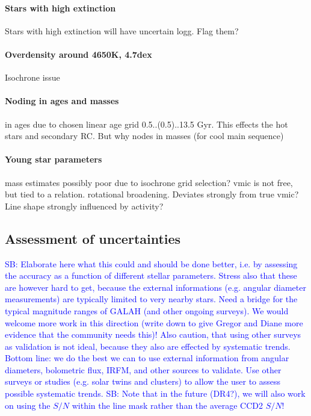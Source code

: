 \documentclass[fleqn,usenatbib,useAMS]{mnras}
\newcommand\SB[1]{\textcolor{blue}{SB: #1}}
\begin{document}
\paragraph*{Stars with high extinction} Stars with high extinction will have uncertain logg. Flag them?

\paragraph*{Overdensity around 4650K, 4.7dex} Isochrone issue

\paragraph*{Noding in ages and masses} in ages due to chosen linear age grid 0.5..(0.5)..13.5 Gyr. This effects the hot stars and secondary RC. But why nodes in masses (for cool main sequence)

\paragraph*{Young star parameters} mass estimates possibly poor due to isochrone grid selection? vmic is not free, but tied to a relation. rotational broadening. Deviates strongly from true vmic? Line shape strongly influenced by activity?

\subsection{Assessment of uncertainties}

\SB{Elaborate here what this could and should be done better, i.e. by assessing the accuracy as a function of different stellar parameters. Stress also that these are however hard to get, because the external informations (e.g. angular diameter measurements) are typically limited to very nearby stars. Need a bridge for the typical magnitude ranges of GALAH (and other ongoing surveys). We would welcome more work in this direction (write down to give Gregor and Diane more evidence that the community needs this)! Also caution, that using other surveys as validation is not ideal, because they also are effected by systematic trends. Bottom line: we do the best we can to use external information from angular diameters, bolometric flux, IRFM, and other sources to validate. Use other surveys or studies (e.g. solar twins and clusters) to allow the user to assess possible systematic trends.}
\SB{Note that in the future (DR4?), we will also work on using the $S/N$ within the line mask rather than the average CCD2 $S/N$!}
\end{document}
